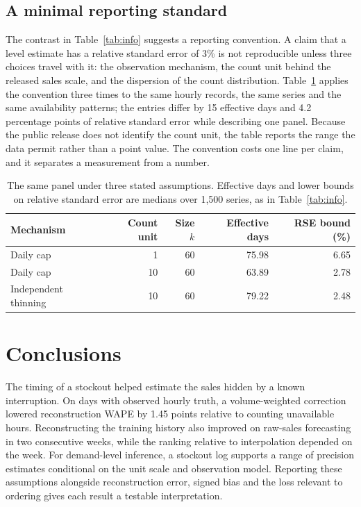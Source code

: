 \documentclass[11pt,a4paper]{article}
\begin{document}
\subsection{A minimal reporting standard}

The contrast in Table~\ref{tab:info} suggests a reporting convention. A claim that a
level estimate has a relative standard error of 3\% is not reproducible unless three
choices travel with it: the observation mechanism, the count unit behind the
released sales scale, and the dispersion of the count distribution.
Table~\ref{tab:report} applies the convention three times to the same hourly
records, the same series and the same availability patterns; the entries differ by
15 effective days and 4.2 percentage points of relative standard error while
describing one panel. Because the public release does not identify the count unit,
the table reports the range the data permit rather than a point value. The
convention costs one line per claim, and it separates a measurement from a number.

\begin{table}[htbp]\centering\small
\caption{The same panel under three stated assumptions. Effective days and lower
bounds on relative standard error are medians over 1{,}500 series, as in
Table~\ref{tab:info}.}
\label{tab:report}
\begin{tabular}{@{}lrrrr@{}}\toprule
Mechanism & Count unit & Size \(k\) & Effective days & RSE bound (\%) \\
\midrule
Daily cap & 1 & 60 & 75.98 & 6.65 \\
Daily cap & 10 & 60 & 63.89 & 2.78 \\
Independent thinning & 10 & 60 & 79.22 & 2.48 \\
\bottomrule\end{tabular}\end{table}

\section{Conclusions}

The timing of a stockout helped estimate the sales hidden by a known interruption. On days with observed hourly truth, a volume-weighted correction lowered reconstruction WAPE by 1.45 points relative to counting unavailable hours. Reconstructing the training history also improved on raw-sales forecasting in two consecutive weeks, while the ranking relative to interpolation depended on the week. For demand-level inference, a stockout log supports a range of precision estimates conditional on the unit scale and observation model. Reporting these assumptions alongside reconstruction error, signed bias and the loss relevant to ordering gives each result a testable interpretation.
\end{document}
